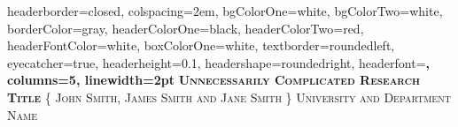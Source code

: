\documentclass[landscape,a0paper,fontscale=0.285]{baposter} %
\begin{document}
\begin{poster}
{
headerborder=closed, %
colspacing=2em, %
bgColorOne=white, %
bgColorTwo=white, %
borderColor=gray, %
headerColorOne=black, %
headerColorTwo=red, %
headerFontColor=white, %
boxColorOne=white, %
textborder=roundedleft, %
eyecatcher=true, %
headerheight=0.1\textheight, %
headershape=roundedright, %
headerfont=\Large\bf\textsc, %
columns=5,
linewidth=2pt %
}
%
{}
{\bf\textsc{Unnecessarily Complicated Research Title}\vspace{0.5em}} %
{\textsc{\{ John Smith, James Smith and Jane Smith \} \hspace{12pt} University and Department Name}} %
{}


\end{poster}
\end{document}
